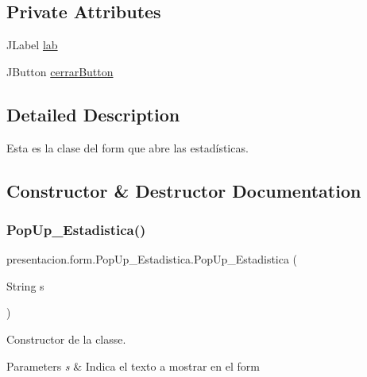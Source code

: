\subsection*{Private Attributes}
\begin{DoxyCompactItemize}
\item 
J\+Label \hyperlink{classpresentacion_1_1form_1_1PopUp__Estadistica_ac61ead9dea9a28c411062fdc951b4df8}{lab}
\item 
J\+Button \hyperlink{classpresentacion_1_1form_1_1PopUp__Estadistica_aad708c3569f3d964b09867708ba60bf6}{cerrar\+Button}
\end{DoxyCompactItemize}


\subsection{Detailed Description}
Esta es la clase del form que abre las estadísticas. 

\subsection{Constructor \& Destructor Documentation}
\mbox{\label{classpresentacion_1_1form_1_1PopUp__Estadistica_a7f2277129654afa8b98cf5c48427b023}} 
\subsubsection{\texorpdfstring{Pop\+Up\+\_\+\+Estadistica()}{PopUp\_Estadistica()}}
{\footnotesize\ttfamily presentacion.\+form.\+Pop\+Up\+\_\+\+Estadistica.\+Pop\+Up\+\_\+\+Estadistica (\begin{DoxyParamCaption}\item[{String}]{s }\end{DoxyParamCaption})\hspace{0.3cm}{\ttfamily [inline]}}



Constructor de la classe. 


\begin{DoxyParams}{Parameters}
{\em s} & Indica el texto a mostrar en el form \\
\hline
\end{DoxyParams}

